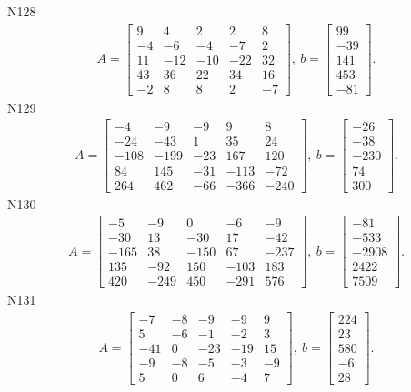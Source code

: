 \documentclass[11pt]{report}
\begin{document}
N128
\begin{align*}
 A = \left[\begin{matrix}9 & 4 & 2 & 2 & 8\\-4 & -6 & -4 & -7 & 2\\11 & -12 & -10 & -22 & 32\\43 & 36 & 22 & 34 & 16\\-2 & 8 & 8 & 2 & -7\end{matrix}\right],
\ b = \left[\begin{matrix}99\\-39\\141\\453\\-81\end{matrix}\right]. 
 \end{align*}
N129
\begin{align*}
 A = \left[\begin{matrix}-4 & -9 & -9 & 9 & 8\\-24 & -43 & 1 & 35 & 24\\-108 & -199 & -23 & 167 & 120\\84 & 145 & -31 & -113 & -72\\264 & 462 & -66 & -366 & -240\end{matrix}\right],
\ b = \left[\begin{matrix}-26\\-38\\-230\\74\\300\end{matrix}\right]. 
 \end{align*}
N130
\begin{align*}
 A = \left[\begin{matrix}-5 & -9 & 0 & -6 & -9\\-30 & 13 & -30 & 17 & -42\\-165 & 38 & -150 & 67 & -237\\135 & -92 & 150 & -103 & 183\\420 & -249 & 450 & -291 & 576\end{matrix}\right],
\ b = \left[\begin{matrix}-81\\-533\\-2908\\2422\\7509\end{matrix}\right]. 
 \end{align*}
N131
\begin{align*}
 A = \left[\begin{matrix}-7 & -8 & -9 & -9 & 9\\5 & -6 & -1 & -2 & 3\\-41 & 0 & -23 & -19 & 15\\-9 & -8 & -5 & -3 & -9\\5 & 0 & 6 & -4 & 7\end{matrix}\right],
\ b = \left[\begin{matrix}224\\23\\580\\-6\\28\end{matrix}\right]. 
 \end{align*}
\end{document}

